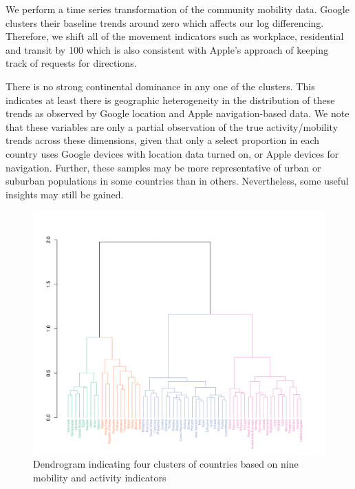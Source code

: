 \documentclass[preprint, 12pt]{elsarticle}
\newcommand{\?}{\stackrel{?}{=}}
\begin{document}
We perform a time series transformation of the community mobility data. Google clusters their baseline trends around zero which affects our log differencing.
Therefore, we shift all of the movement indicators such as workplace, residential and transit by 100 which is also consistent with Apple's approach of keeping track of requests for directions.

There is no strong continental dominance in any one of the clusters.
This indicates at least there is geographic heterogeneity in the distribution of these trends as observed by Google location and Apple navigation-based data.
We note that these variables are only a partial observation of the true activity/mobility trends across these dimensions, given that only a select proportion in each country uses Google devices with location data turned on, or Apple devices for navigation.
Further, these samples may be more representative of urban or suburban populations in some countries than in others.
Nevertheless, some useful insights may still be gained.

\begin{figure}[h!]
  \includegraphics[width=\textwidth,trim={0cm 0 1.9cm 7cm},clip]{dendrogram}
  \caption{Dendrogram indicating four clusters of countries based on nine mobility and activity indicators}
  \label{fig:dend}
\end{figure}
\end{document}

